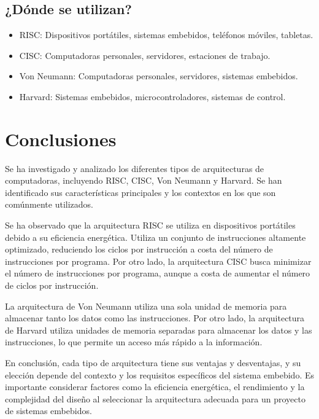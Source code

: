 \documentclass[12pt]{report}
\begin{document}
\section{¿Dónde se utilizan?}
\begin{itemize}
  \item RISC: Dispositivos portátiles, sistemas embebidos, teléfonos móviles, tabletas.
  \item CISC: Computadoras personales, servidores, estaciones de trabajo.
  \item Von Neumann: Computadoras personales, servidores, sistemas embebidos.
  \item Harvard: Sistemas embebidos, microcontroladores, sistemas de control.
\end{itemize}
\newpage

\chapter{Conclusiones}

Se ha investigado y analizado los diferentes tipos de arquitecturas de computadoras, incluyendo RISC, CISC, Von Neumann y Harvard. Se han identificado sus características principales y los contextos en los que son comúnmente utilizados.

Se ha observado que la arquitectura RISC se utiliza en dispositivos portátiles debido a su eficiencia energética. Utiliza un conjunto de instrucciones altamente optimizado, reduciendo los ciclos por instrucción a costa del número de instrucciones por programa. Por otro lado, la arquitectura CISC busca minimizar el número de instrucciones por programa, aunque a costa de aumentar el número de ciclos por instrucción.

La arquitectura de Von Neumann utiliza una sola unidad de memoria para almacenar tanto los datos como las instrucciones. Por otro lado, la arquitectura de Harvard utiliza unidades de memoria separadas para almacenar los datos y las instrucciones, lo que permite un acceso más rápido a la información.

En conclusión, cada tipo de arquitectura tiene sus ventajas y desventajas, y su elección depende del contexto y los requisitos específicos del sistema embebido. Es importante considerar factores como la eficiencia energética, el rendimiento y la complejidad del diseño al seleccionar la arquitectura adecuada para un proyecto de sistemas embebidos.
\end{document}
